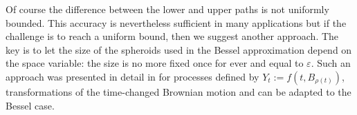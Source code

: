 \documentclass[12pt]{article}
\numberwithin{equation}{section}
\begin{document}
Of course the difference between the lower and upper paths is not uniformly bounded. This accuracy is nevertheless sufficient in many applications but if the challenge is to reach a uniform bound, then we suggest another approach. The key is to let the size of the spheroids used in the Bessel approximation depend on the space variable: the size is no more fixed once for ever and equal to $\varepsilon$. Such an approach was presented in detail in \cite{deaconu2020strong} for processes defined by $Y_t:=f(t,B_{\rho(t)})$, transformations of the time-changed Brownian motion and can be adapted to the Bessel case.


\end{document}

